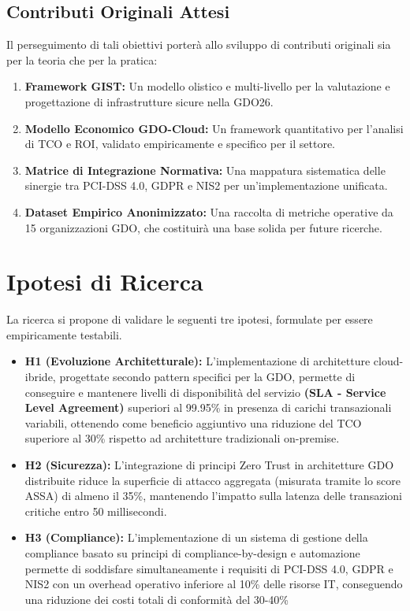 \subsection{Contributi Originali Attesi}
Il perseguimento di tali obiettivi porterà allo sviluppo di contributi originali sia per la teoria che per la pratica:
\begin{enumerate}
    \item \textbf{Framework GIST:} Un modello olistico e multi-livello per la valutazione e progettazione di infrastrutture sicure nella GDO26.
    \item \textbf{Modello Economico GDO-Cloud:} Un framework quantitativo per l'analisi di TCO e ROI, validato empiricamente e specifico per il settore.
    \item \textbf{Matrice di Integrazione Normativa:} Una mappatura sistematica delle sinergie tra PCI-DSS 4.0, GDPR e NIS2 per un'implementazione unificata.
    \item \textbf{Dataset Empirico Anonimizzato:} Una raccolta di metriche operative da 15 organizzazioni GDO, che costituirà una base solida per future ricerche.
\end{enumerate}



\section{Ipotesi di Ricerca}
La ricerca si propone di validare le seguenti tre ipotesi, formulate per essere empiricamente testabili.
\begin{itemize}
    \item \textbf{H1 (Evoluzione Architetturale):} L'implementazione di architetture cloud-ibride, progettate secondo pattern specifici per la GDO, permette di conseguire e mantenere livelli di disponibilità del servizio \textbf{(SLA - Service Level Agreement)} superiori al 99.95\% in presenza di carichi transazionali variabili, ottenendo come beneficio aggiuntivo una riduzione del TCO superiore al 30\% rispetto ad architetture tradizionali on-premise.
    \item \textbf{H2 (Sicurezza):} L'integrazione di principi Zero Trust in architetture GDO distribuite riduce la superficie di attacco aggregata (misurata tramite lo score ASSA) di almeno il 35\%, mantenendo l'impatto sulla latenza delle transazioni critiche entro 50 millisecondi.
    \item \textbf{H3 (Compliance):} L'implementazione di un sistema di gestione della compliance basato su principi di compliance-by-design e automazione permette di soddisfare simultaneamente i requisiti di PCI-DSS 4.0, GDPR e NIS2 con un overhead operativo inferiore al 10\% delle risorse IT, conseguendo una riduzione dei costi totali di conformità del 30-40\%
\end{itemize}
